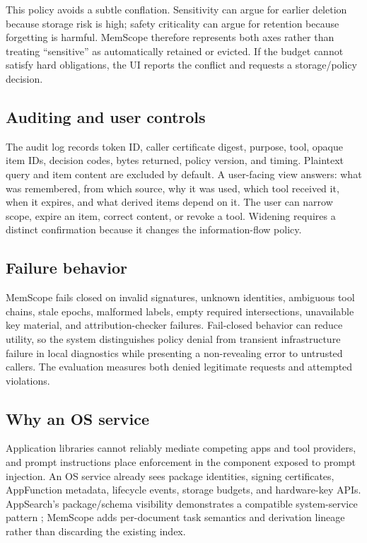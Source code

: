 This policy avoids a subtle conflation. Sensitivity can argue for earlier deletion because storage risk is high; safety criticality can argue for retention because forgetting is harmful. MemScope therefore represents both axes rather than treating ``sensitive'' as automatically retained or evicted. If the budget cannot satisfy hard obligations, the UI reports the conflict and requests a storage/policy decision.

\subsection{Auditing and user controls}

The audit log records token ID, caller certificate digest, purpose, tool, opaque item IDs, decision codes, bytes returned, policy version, and timing. Plaintext query and item content are excluded by default. A user-facing view answers: what was remembered, from which source, why it was used, which tool received it, when it expires, and what derived items depend on it. The user can narrow scope, expire an item, correct content, or revoke a tool. Widening requires a distinct confirmation because it changes the information-flow policy.

\subsection{Failure behavior}

MemScope fails closed on invalid signatures, unknown identities, ambiguous tool chains, stale epochs, malformed labels, empty required intersections, unavailable key material, and attribution-checker failures. Fail-closed behavior can reduce utility, so the system distinguishes policy denial from transient infrastructure failure in local diagnostics while presenting a non-revealing error to untrusted callers. The evaluation measures both denied legitimate requests and attempted violations.

\subsection{Why an OS service}

Application libraries cannot reliably mediate competing apps and tool providers, and prompt instructions place enforcement in the component exposed to prompt injection. An OS service already sees package identities, signing certificates, AppFunction metadata, lifecycle events, storage budgets, and hardware-key APIs. AppSearch's package/schema visibility demonstrates a compatible system-service pattern \citep{android2026visibility}; MemScope adds per-document task semantics and derivation lineage rather than discarding the existing index.
